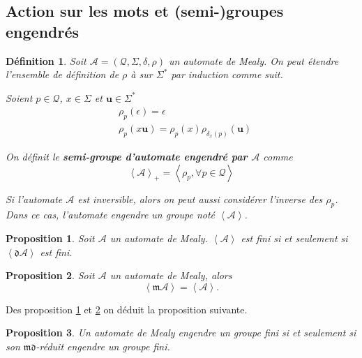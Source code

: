 \documentclass[11pt,a4paper]{article}
\newtheorem{prop}{Proposition}
\newtheorem{definition}{Définition}
\begin{document}
\subsection{Action sur les mots et (semi-)groupes engendrés\label{sec:action}}

\begin{definition}
  Soit $\mathcal{A}=\left(\mathcal{Q}, \Sigma, \delta, \rho\right)$ un automate de Mealy. On peut étendre l'ensemble de définition de $\rho$ à sur $\Sigma^*$ par induction comme suit.

  Soient $p\in\mathcal{Q}$, $x\in\Sigma$ et $\textbf{u}\in\Sigma^*$
  \begin{align*}
    &\rho_p(\epsilon)=\epsilon \\
    &\rho_p(x\textbf{u})=\rho_p(x)\rho_{\delta_x(p)}(\textbf{u})
  \end{align*}

  On définit le \textbf{semi-groupe d'automate engendré par $\mathcal{A}$} comme
  \begin{equation*}
    \left<\mathcal{A}\right>_+=\left<\rho_p, \forall p\in\mathcal{Q}\right>
  \end{equation*}

  Si l'automate $\mathcal{A}$ est inversible, alors on peut aussi considérer l'inverse des $\rho_p$. Dans ce cas, l'automate engendre un groupe noté $\left<\mathcal{A}\right>$.

\end{definition}

\begin{prop}{\cite{DBLP:journals/corr/abs-1105-4725}}
  \label{prop:finitude-d}
  Soit $\mathcal{A}$ un automate de Mealy. $\left<\mathcal{A}\right>$ est fini si et seulement si $\left<\mathfrak{d}\mathcal{A}\right>$ est fini.
\end{prop}

\begin{prop}{\cite{DBLP:journals/corr/abs-1105-4725}}
  \label{prop:finitude-m}
  Soit $\mathcal{A}$ un automate de Mealy, alors
  \[ \left<\mathfrak{m}\mathcal{A}\right> = \left<\mathcal{A}\right>. \]
\end{prop}

Des proposition \ref{prop:finitude-d} et \ref{prop:finitude-m} on déduit la proposition suivante.

\begin{prop}
  \label{prop:md-trivial}
  Un automate de Mealy engendre un groupe fini si et seulement si son $\mathfrak{md}$-réduit engendre un groupe fini.
\end{prop}
\end{document}

